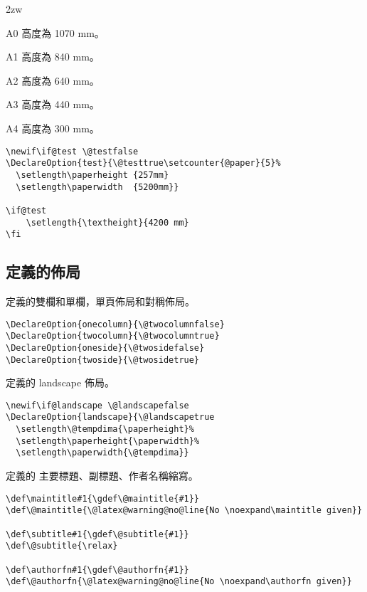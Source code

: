 \par{}
\begin{biao}[高度]\leftskip 2zw
\item[A0] 高度為 1070 mm。
\item[A1] 高度為 840 mm。
\item[A2] 高度為 640 mm。
\item[A3]	高度為 440 mm。
\item[A4] 高度為 300 mm。
\end{biao}

\begin{lstlisting}[firstnumber=36]
\newif\if@test \@testfalse
\DeclareOption{test}{\@testtrue\setcounter{@paper}{5}%
  \setlength\paperheight {257mm}
  \setlength\paperwidth  {5200mm}}

\if@test
    \setlength{\textheight}{4200 mm}
\fi
\end{lstlisting}

\subsection{定義的佈局}

\par%
定義的雙欄和單欄，單頁佈局和對稱佈局。
\begin{lstlisting}[firstnumber=45]
\DeclareOption{onecolumn}{\@twocolumnfalse}
\DeclareOption{twocolumn}{\@twocolumntrue}
\DeclareOption{oneside}{\@twosidefalse}
\DeclareOption{twoside}{\@twosidetrue}
\end{lstlisting}

\par%
定義的 landscape 佈局。
\begin{lstlisting}[firstnumber=51]
\newif\if@landscape \@landscapefalse
\DeclareOption{landscape}{\@landscapetrue
  \setlength\@tempdima{\paperheight}%
  \setlength\paperheight{\paperwidth}%
  \setlength\paperwidth{\@tempdima}}
\end{lstlisting}

\par%
定義的 主要標題、副標題、作者名稱縮寫。
\begin{lstlisting}[firstnumber=58]
\def\maintitle#1{\gdef\@maintitle{#1}}
\def\@maintitle{\@latex@warning@no@line{No \noexpand\maintitle given}}

\def\subtitle#1{\gdef\@subtitle{#1}}
\def\@subtitle{\relax}

\def\authorfn#1{\gdef\@authorfn{#1}}
\def\@authorfn{\@latex@warning@no@line{No \noexpand\authorfn given}}
\end{lstlisting}

